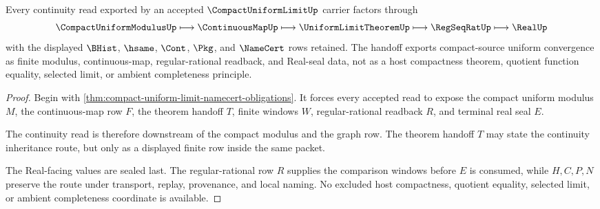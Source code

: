 \begin{theorem}
\label{thm:compact-uniform-limit-continuity-handoff}
Every continuity read exported by an accepted $\CompactUniformLimitUp$ carrier factors through
$$
\CompactUniformModulusUp \longmapsto \ContinuousMapUp \longmapsto \UniformLimitTheoremUp \longmapsto \RegSeqRatUp \longmapsto \RealUp
$$
with the displayed $\BHist$, $\hsame$, $\Cont$, $\Pkg$, and $\NameCert$ rows retained. The handoff exports compact-source uniform convergence as finite modulus, continuous-map, regular-rational readback, and Real-seal data, not as a host compactness theorem, quotient function equality, selected limit, or ambient completeness principle.
\end{theorem}
\begin{proof}
Begin with \autoref{thm:compact-uniform-limit-namecert-obligations}. It forces every accepted read to expose the compact uniform modulus $M$, the continuous-map row $F$, the theorem handoff $T$, finite windows $W$, regular-rational readback $R$, and terminal real seal $E$.

The continuity read is therefore downstream of the compact modulus and the graph row. The theorem handoff $T$ may state the continuity inheritance route, but only as a displayed finite row inside the same packet.

The Real-facing values are sealed last. The regular-rational row $R$ supplies the comparison windows before $E$ is consumed, while $H,C,P,N$ preserve the route under transport, replay, provenance, and local naming. No excluded host compactness, quotient equality, selected limit, or ambient completeness coordinate is available.
\end{proof}



